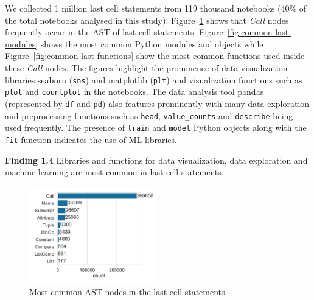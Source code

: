 \documentclass[smallextended]{svjour3}       %
\newcommand{\highlight}[1]{\begin{framed}%
  \noindent#1
\end{framed}}
\begin{document}
We collected 1 million last cell statements from 119 thousand notebooks (40\% of the total notebooks analysed in this study). Figure~\ref{fig:common-last-nodes} shows that \emph{Call} nodes frequently occur in the AST of last cell statements. Figure~\ref{fig:common-last-modules} shows the most common Python modules and objects while Figure~\ref{fig:common-last-functions} show the most common functions used inside these \emph{Call} nodes. The figures highlight the prominence of data visualization libraries seaborn (\lstinline{sns}) and matplotlib (\lstinline{plt}) and visualization functions such as \lstinline{plot} and \lstinline{countplot} in the notebooks. The data analysis tool pandas (represented by \lstinline{df} and \lstinline{pd}) also features prominently with many data exploration and preprocessing functions such as \lstinline{head}, \lstinline{value_counts} and \lstinline{describe} being used frequently. The presence of \lstinline{train} and \lstinline{model} Python objects along with the \lstinline{fit} function indicates the use of ML libraries.

\highlight{\textbf{Finding 1.4} Libraries and functions for data visualization, data exploration and machine learning are most common in last cell statements.}

\begin{figure}
  \centering
  \includegraphics[width=0.5\textwidth]{common-last-nodes.pdf}
  \caption{Most common AST nodes in the last cell statements.}
  \label{fig:common-last-nodes}
\end{figure}
\end{document}
